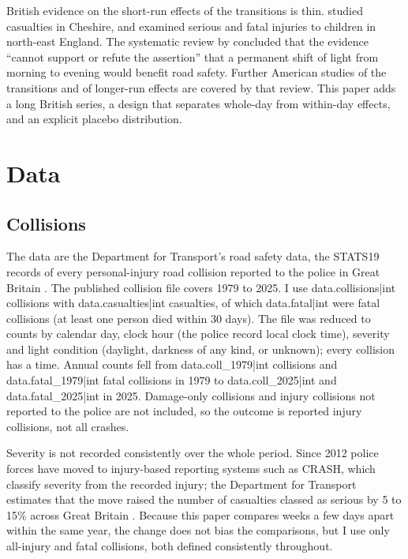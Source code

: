 \documentclass[11pt,a4paper]{article}
\begin{document}
British evidence on the short-run effects of the transitions is thin. \citet{whittaker1996} studied casualties in Cheshire, and \citet{adams2005} examined serious and fatal injuries to children in north-east England. The systematic review by \citet{carey2017} concluded that the evidence ``cannot support or refute the assertion'' that a permanent shift of light from morning to evening would benefit road safety. Further American studies of the transitions and of longer-run effects \citep{meyerhoff1978,ferguson1995,coate2004,sood2007,stevens2006,huang2010} are covered by that review. This paper adds a long British series, a design that separates whole-day from within-day effects, and an explicit placebo distribution.

\section{Data}\label{sec:data}
\subsection{Collisions}
The data are the Department for Transport's road safety data, the STATS19 records of every personal-injury road collision reported to the police in Great Britain \citep{dft2026}. The published collision file covers 1979 to 2025. I use {{data.collisions|int}} collisions with {{data.casualties|int}} casualties, of which {{data.fatal|int}} were fatal collisions (at least one person died within 30 days). The file was reduced to counts by calendar day, clock hour (the police record local clock time), severity and light condition (daylight, darkness of any kind, or unknown); every collision has a time. Annual counts fell from {{data.coll_1979|int}} collisions and {{data.fatal_1979|int}} fatal collisions in 1979 to {{data.coll_2025|int}} and {{data.fatal_2025|int}} in 2025. Damage-only collisions and injury collisions not reported to the police are not included, so the outcome is reported injury collisions, not all crashes.

Severity is not recorded consistently over the whole period. Since 2012 police forces have moved to injury-based reporting systems such as CRASH, which classify severity from the recorded injury; the Department for Transport estimates that the move raised the number of casualties classed as serious by 5 to 15\% across Great Britain \citep{dftseverity2026}. Because this paper compares weeks a few days apart within the same year, the change does not bias the comparisons, but I use only all-injury and fatal collisions, both defined consistently throughout.
\end{document}
